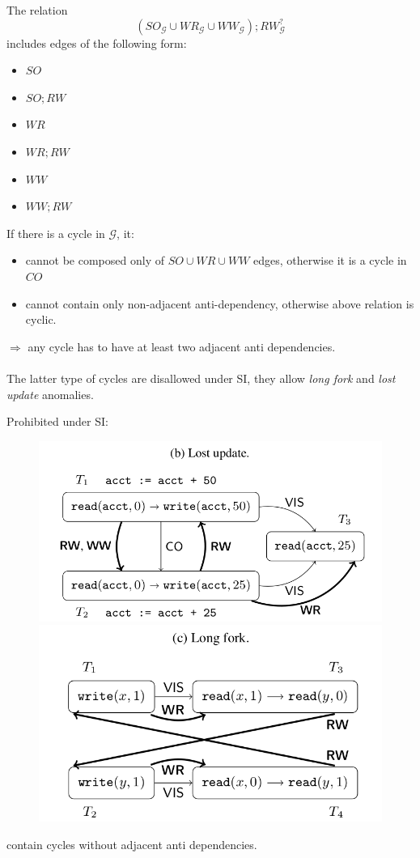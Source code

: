 \documentclass{beamer}
\begin{document}
\begin{frame}
	The relation $$(SO_\mathcal{G} \cup WR_\mathcal{G} \cup WW_\mathcal{G}); RW_\mathcal{G}^?$$ includes edges of the following form:
	\begin{multicols}{3}
		\begin{itemize}
			\item $SO$
			\item $SO;RW$
			\item $WR$
			\item $WR;RW$
			\item $WW$
			\item $WW;RW$
		\end{itemize}
	\end{multicols}
	If there is a cycle in $\mathcal{G}$, it:
	\begin{itemize}
		\item cannot be composed only of $SO\cup WR \cup WW$ edges, otherwise it is a cycle in $CO$
		\item cannot contain only non-adjacent anti-dependency, otherwise above relation is cyclic.
	\end{itemize}
	$\Rightarrow$ any cycle has to have at least two adjacent anti dependencies. \\
	\hfill \\
	The latter type of cycles are disallowed under SI, they allow \textit{long fork} and \textit{lost update} anomalies.
\end{frame}


\begin{frame}
	Prohibited under SI:
	\begin{figure}
		\includegraphics[scale=0.2]{fig2b}
		\includegraphics[scale=0.2]{fig2c}
	\end{figure}
	contain cycles without adjacent anti dependencies.
\end{frame}
\end{document}
